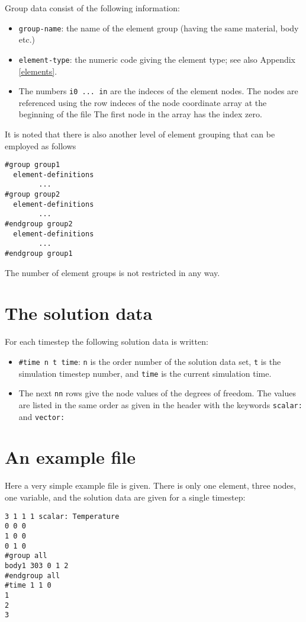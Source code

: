 Group data consist of the following information:
\begin{itemize}
\item {\tt group-name}: the name of the element group (having the same material, body etc.)
\item {\tt element-type}: the numeric code giving the element type; see also 
Appendix \ref{elements}.
\item The numbers {\tt i0 ... in} are the indeces of the element nodes. The nodes are referenced
using the row indeces of the node coordinate array at the beginning of the file
The first node in the array has the index zero.
\end{itemize}
It is noted that there is also another level of element grouping that
can be employed as follows
\begin{verbatim}
#group group1
  element-definitions
        ...
#group group2
  element-definitions
        ...
#endgroup group2
  element-definitions
        ...
#endgroup group1
\end{verbatim}
The number of element groups is not restricted in any way.


\section*{The solution data}

For each timestep the following solution data is written:
\begin{itemize}
\item {\tt \#time n t time}: {\tt n} is the order number of the solution data set,
{\tt t} is the simulation timestep number, and {\tt time} is the current simulation time.
\item The next {\tt nn} rows give the node values of the degrees of freedom. The values are
listed in the same order as given in the header with the keywords {\tt scalar:} and 
{\tt vector:} 
\end{itemize}

\section*{An example file}

Here a very simple example file is given. There
is only one element, three nodes, one variable, and the solution data
are given for a single timestep:
\begin{verbatim}
3 1 1 1 scalar: Temperature
0 0 0
1 0 0
0 1 0
#group all
body1 303 0 1 2
#endgroup all
#time 1 1 0
1
2
3
\end{verbatim}


